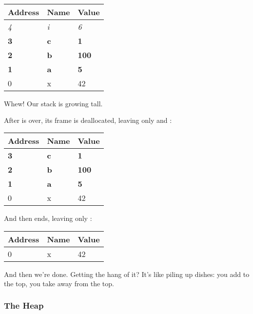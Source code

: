 \begin{table}[H]
  \begin{tabular}{|l|l|l|}
    \hline
    \textbf{Address} & \textbf{Name} & \textbf{Value} \\
    \hline
    \textit{4} & \textit{i} & \textit{6} \\
    \hline
    \textbf{3} & \textbf{c} & \textbf{1} \\
    \hline
    \textbf{2} & \textbf{b} & \textbf{100} \\
    \hline
    \textbf{1} & \textbf{a} & \textbf{5} \\
    \hline
    0 & x & 42 \\
    \hline
  \end{tabular}
\end{table}

Whew! Our stack is growing tall.

\blank

After  is over, its frame is deallocated, leaving only  and :

\begin{table}[H]
  \begin{tabular}{|l|l|l|}
    \hline
    \textbf{Address} & \textbf{Name} & \textbf{Value} \\
    \hline
    \textbf{3} & \textbf{c} & \textbf{1} \\
    \hline
    \textbf{2} & \textbf{b} & \textbf{100} \\
    \hline
    \textbf{1} & \textbf{a} & \textbf{5} \\
    \hline
    0 & x & 42 \\
    \hline
  \end{tabular}
\end{table}

And then  ends, leaving only :

\begin{table}[H]
  \begin{tabular}{|l|l|l|}
    \hline
    \textbf{Address} & \textbf{Name} & \textbf{Value} \\
    \hline
    0 & x & 42 \\
    \hline
  \end{tabular}
\end{table}

And then we're done. Getting the hang of it? It's like piling up dishes: you add to the top, you take away from the top.


\subsubsection*{The Heap}

